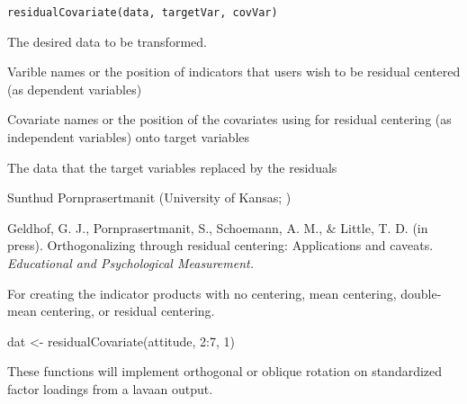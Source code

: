 \documentclass[a4paper]{book}
\begin{document}
%
\begin{Usage}
\begin{verbatim}
residualCovariate(data, targetVar, covVar)
\end{verbatim}
\end{Usage}
%
\begin{Arguments}
\begin{ldescription}
\item[\code{data}] 
The desired data to be transformed.

\item[\code{targetVar}] 
Varible names or the position of indicators that users wish to be residual centered (as dependent variables)

\item[\code{covVar}] 
Covariate names or the position of the covariates using for residual centering (as independent variables) onto target variables

\end{ldescription}
\end{Arguments}
%
\begin{Value}
The data that the target variables replaced by the residuals
\end{Value}
%
\begin{Author}\relax
Sunthud Pornprasertmanit (University of Kansas; )
\end{Author}
%
\begin{References}\relax
Geldhof, G. J., Pornprasertmanit, S., Schoemann, A. M., \& Little, T. D. (in press). Orthogonalizing through residual centering: Applications and caveats. \emph{Educational and Psychological Measurement.}
\end{References}
%
\begin{SeeAlso}\relax
{} For creating the indicator products with no centering, mean centering, double-mean centering, or residual centering.	
\end{SeeAlso}
%
\begin{Examples}
\begin{ExampleCode}
dat <- residualCovariate(attitude, 2:7, 1)
\end{ExampleCode}
\end{Examples}
%
\begin{Description}\relax
These functions will implement orthogonal or oblique rotation on standardized factor loadings from a lavaan output. 
\end{Description}
\end{document}
